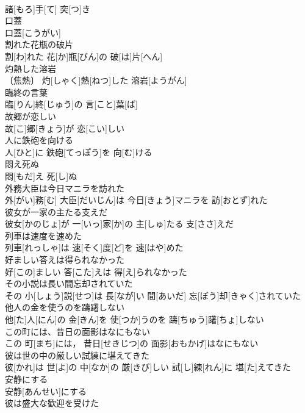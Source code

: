 \documentclass[8pt]{extreport}
\begin{document}
\begin{CJK}{UTF8}{min}
\\	諸[もろ]手[て] 突[つ]き
\\	口蓋	
\\	口蓋[こうがい]
\\	割れた花瓶の破片	
\\	割[わ]れた 花[か]瓶[びん]の 破[は]片[へん]
\\	灼熱した溶岩	
\\	〔焦熱〕	灼[しゃく]熱[ねつ]した 溶岩[ようがん]
\\	臨終の言葉	
\\	臨[りん]終[じゅう]の 言[こと]葉[ば]
\\	故郷が恋しい	
\\	故[こ]郷[きょう]が 恋[こい]しい
\\	人に鉄砲を向ける	
\\	人[ひと]に 鉄砲[てっぽう]を 向[む]ける
\\	悶え死ぬ	
\\	悶[もだ]え 死[し]ぬ
\\	外務大臣は今日マニラを訪れた	
\\	外[がい]務[む] 大臣[だいじん]は 今日[きょう]マニラを 訪[おとず]れた
\\	彼女が一家の主たる支えだ	
\\	彼女[かのじょ]が 一[いっ]家[か]の 主[しゅ]たる 支[ささ]えだ
\\	列車は速度を速めた	
\\	列車[れっしゃ]は 速[そく]度[ど]を 速[はや]めた
\\	好ましい答えは得られなかった	
\\	好[この]ましい 答[こた]えは 得[え]られなかった
\\	その小説は長い間忘却されていた	
\\	その 小[しょう]説[せつ]は 長[なが]い 間[あいだ] 忘[ぼう]却[きゃく]されていた
\\	他人の金を使うのを躊躇しない	
\\	他[た]人[にん]の 金[きん]を 使[つか]うのを 躊[ちゅう]躇[ちょ]しない
\\	この町には、昔日の面影はなにもない	
\\	この 町[まち]には， 昔日[せきじつ]の 面影[おもかげ]はなにもない
\\	彼は世の中の厳しい試練に堪えてきた	
\\	彼[かれ]は 世[よ]の 中[なか]の 厳[きび]しい 試[し]練[れん]に 堪[た]えてきた
\\	安静にする	
\\	安静[あんせい]にする
\\	彼は盛大な歓迎を受けた	

\end{CJK}
\end{document}
